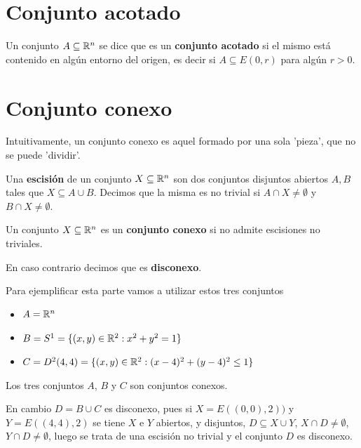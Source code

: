 \section{Conjunto acotado}

\begin{definition}[Acotado]
Un conjunto $A \subseteq \mathbb{R}^n$ se dice que es un \textbf{conjunto acotado}  si el mismo está contenido en algún entorno del origen, es decir si $ A \subseteq E(0, r)$ para algún $r > 0$.
\end{definition}

\section{Conjunto conexo}

Intuitivamente, un conjunto conexo es aquel formado por una sola 'pieza', que no se puede 'dividir'.

\begin{definition}[Conexo]
Una \textbf{escisión} de un conjunto $X \subseteq \mathbb{R}^n$ son dos conjuntos disjuntos abiertos $A,B$ tales que $ X \subseteq A \cup B$.  Decimos que la misma es no trivial si $A \cap X \neq \emptyset$ y $B \cap X \neq \emptyset$.

Un conjunto $ X \subseteq \mathbb{R}^n$ es un \textbf{conjunto conexo}  si no admite escisiones no triviales.  

En caso contrario decimos que es \textbf{disconexo}.
\end{definition}

\begin{example}
Para ejemplificar esta parte vamos a utilizar estos tres conjuntos

\begin{itemize}
\item $ A = \mathbb{R}^n $

\item $ B = S^1 = \{ (x,y) \in \mathbb{R}^2 : x^2 + y^2 = 1\}$

\item $ C = D^2(4,4) = \{ (x,y) \in \mathbb{R}^2 : (x-4)^2 + (y-4)^2 \leq 1 \}$ 
\end{itemize}

Los tres conjuntos $A$, $B$ y $C$ son conjuntos conexos.

En cambio $D = B \cup C$ es disconexo, pues si $X = E((0,0),2))$ y $Y=E((4,4), 2)$ se tiene $X$ e $Y$ abiertos, y disjuntos, $ D \subseteq X \cup Y$, $X \cap D \neq \emptyset$, $Y \cap D \neq \emptyset$, luego se trata de una escisión no trivial y el conjunto $D$ es disconexo.
\end{example}

